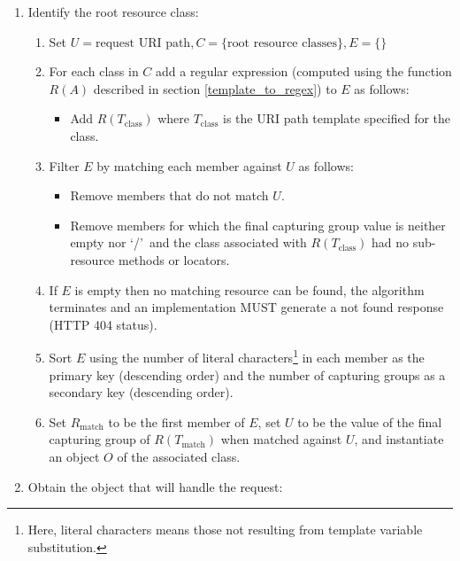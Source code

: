 \begin{enumerate}
\item Identify the root resource class:

\begin{enumerate}
\item Set $U=\mbox{request URI path}, C=\{\mbox{root resource classes}\}, E=\{\}$

\item For each class in $C$ add a regular expression (computed using the function $R(A)$ described in section \ref{template_to_regex}) to $E$ as follows:
\begin{itemize}
\item Add $R(T_{\mbox{class}})$ where $T_{\mbox{class}}$ is the URI path template specified for the class.
\end{itemize}

\item Filter $E$ by matching each member against $U$ as follows:
\begin{itemize}
\item Remove members that do not match $U$.
\item Remove members for which the final capturing group value is neither empty nor \lq/\rq\ and the class associated with $R(T_{\mbox{class}})$ had no sub-resource methods or locators.
\end{itemize}

\item If $E$ is empty then no matching resource can be found, the algorithm terminates and an implementation MUST generate a not found response (HTTP 404 status).

\item Sort $E$ using the number of literal characters\footnote{Here, literal characters means those not resulting from template variable substitution.} in each member as the primary key (descending order) and the number of capturing groups as a secondary key (descending order).

\item Set $R_{\mbox{match}}$ to be the first member of $E$, set $U$ to be the value of the final capturing group of $R(T_{\mbox{match}})$ when matched against $U$, and instantiate an object $O$ of the associated class.

\end{enumerate}

\item \label{find_object} Obtain the object that will handle the request:


\end{enumerate}
